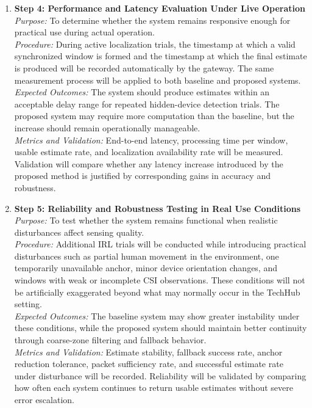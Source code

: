 \begin{enumerate}
    \item \textbf{Step 4: Performance and Latency Evaluation Under Live Operation} \\
    \textit{Purpose:} To determine whether the system remains responsive enough for practical use during actual operation. \\
    \textit{Procedure:} During active localization trials, the timestamp at which a valid synchronized window is formed and the timestamp at which the final estimate is produced will be recorded automatically by the gateway. The same measurement process will be applied to both baseline and proposed systems. \\
    \textit{Expected Outcomes:} The system should produce estimates within an acceptable delay range for repeated hidden-device detection trials. The proposed system may require more computation than the baseline, but the increase should remain operationally manageable. \\
    \textit{Metrics and Validation:} End-to-end latency, processing time per window, usable estimate rate, and localization availability rate will be measured. Validation will compare whether any latency increase introduced by the proposed method is justified by corresponding gains in accuracy and robustness.

    \item \textbf{Step 5: Reliability and Robustness Testing in Real Use Conditions} \\
    \textit{Purpose:} To test whether the system remains functional when realistic disturbances affect sensing quality. \\
    \textit{Procedure:} Additional IRL trials will be conducted while introducing practical disturbances such as partial human movement in the environment, one temporarily unavailable anchor, minor device orientation changes, and windows with weak or incomplete CSI observations. These conditions will not be artificially exaggerated beyond what may normally occur in the TechHub setting. \\
    \textit{Expected Outcomes:} The baseline system may show greater instability under these conditions, while the proposed system should maintain better continuity through coarse-zone filtering and fallback behavior. \\
    \textit{Metrics and Validation:} Estimate stability, fallback success rate, anchor reduction tolerance, packet sufficiency rate, and successful estimate rate under disturbance will be recorded. Reliability will be validated by comparing how often each system continues to return usable estimates without severe error escalation.


\end{enumerate}
